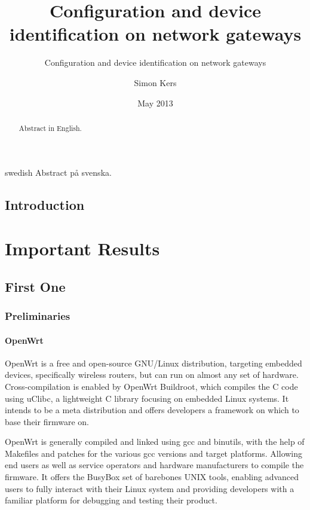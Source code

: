 \documentclass[a4paper,11pt]{kth-mag}
\title{Configuration and device identification on network gateways}
\subtitle{Configuration and device identification on network gateways}
\author{Simon Kers}
\date{May 2013}
\begin{document}
\frontmatter
\pagestyle{empty}
\removepagenumbers
\maketitle
{}
\begin{abstract}
   Abstract in English.

\end{abstract}
\clearpage
\begin{foreignabstract}{swedish}
   Abstract på svenska.

\end{foreignabstract}
\clearpage
\tableofcontents*
\mainmatter
\pagestyle{newchap}
\chapter{Introduction}

\part{Important Results}

\chapter{First One}

\section{Preliminaries}

\subsection{OpenWrt}
OpenWrt is a free and open-source GNU/Linux distribution, targeting embedded
devices, specifically wireless routers, but can run on almost any set of hardware.
Cross-compilation is enabled by OpenWrt Buildroot, which compiles the C code
using uClibc, a lightweight C library focusing on embedded Linux systems. 
It intends to be a meta distribution and offers developers a framework on which
to base their firmware on.

OpenWrt is generally compiled and linked using gcc and binutils, with the help
of Makefiles and patches for the various gcc versions and target platforms.
Allowing end users as well as service operators and hardware manufacturers
to compile the firmware. It offers the BusyBox set of barebones UNIX tools,
enabling advanced users to fully interact with their Linux system and providing
developers with a familiar platform for debugging and testing their product.
\end{document}
